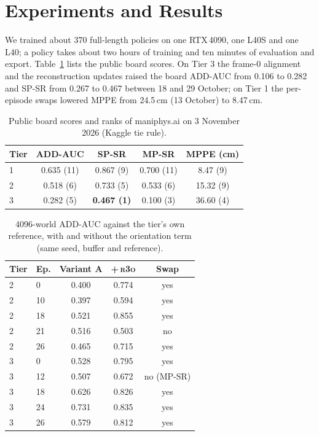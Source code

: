 \documentclass[10pt]{nvidiaextabstract}
\newcommand{\rtho}{\textsc{r3o}\xspace}
\begin{document}
\section{Experiments and Results}
\label{sec:experiments}

We trained about 370 full-length policies on one RTX\,4090, one L40S and one L40; a policy takes about two hours of training and ten minutes of evaluation and export.
Table~\ref{tab:board} lists the public board scores.
On Tier 3 the frame-0 alignment and the reconstruction updates raised the board ADD-AUC from 0.106 to 0.282 and SP-SR from 0.267 to 0.467 between 18 and 29 October; on Tier 1 the per-episode swaps lowered MPPE from 24.5\,cm (13 October) to 8.47\,cm.

\begin{table}[t]
  \centering
  \small
  \begin{tabular}{lcccc}
    \toprule
    Tier & ADD-AUC & SP-SR & MP-SR & MPPE (cm) \\
    \midrule
    1 & 0.635 (11) & 0.867 (9) & 0.700 (11) & 8.47 (9) \\
    2 & 0.518 (6)  & 0.733 (5) & 0.533 (6)  & 15.32 (9) \\
    3 & 0.282 (5)  & \textbf{0.467 (1)} & 0.100 (3) & 36.60 (4) \\
    \bottomrule
  \end{tabular}
  \caption{Public board scores and ranks of maniphys.ai on 3 November 2026 (Kaggle tie rule).}
  \label{tab:board}
\end{table}

\begin{table}[t]
  \centering
  \small
  \begin{tabular}{llccc}
    \toprule
    Tier & Ep. & Variant A & +\,\rtho & Swap \\
    \midrule
    2 & 0  & 0.400 & 0.774 & yes \\
    2 & 10 & 0.397 & 0.594 & yes \\
    2 & 18 & 0.521 & 0.855 & yes \\
    2 & 21 & 0.516 & 0.503 & no \\
    2 & 26 & 0.465 & 0.715 & yes \\
    3 & 0  & 0.528 & 0.795 & yes \\
    3 & 12 & 0.507 & 0.672 & no (MP-SR) \\
    3 & 18 & 0.626 & 0.826 & yes \\
    3 & 24 & 0.731 & 0.835 & yes \\
    3 & 26 & 0.579 & 0.812 & yes \\
    \bottomrule
  \end{tabular}
  \caption{4096-world ADD-AUC against the tier's own reference, with and without the orientation term (same seed, buffer and reference).}
  \label{tab:r3o}
\end{table}
\end{document}
